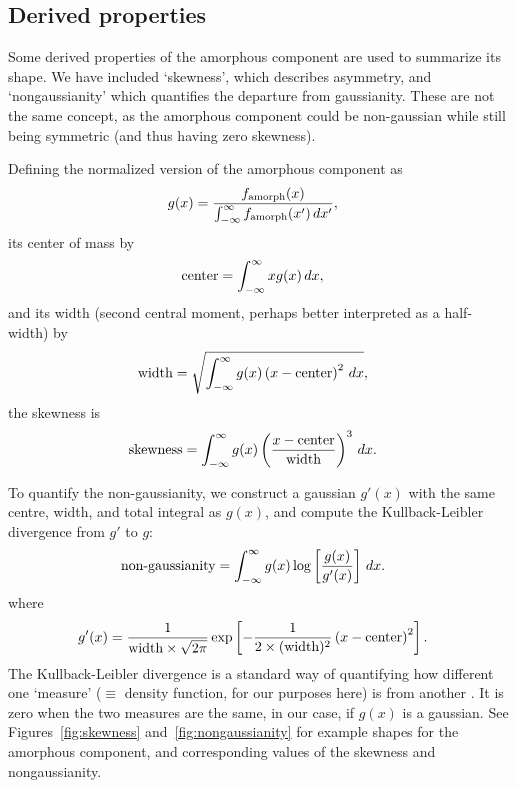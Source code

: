 \documentclass[preprint, a4paper]{elsarticle}
\newcommand{\x}{x}
\begin{document}
\subsection{Derived properties}
Some derived properties of the amorphous component are used to summarize its shape.
We have included `skewness', which describes asymmetry, and `nongaussianity'
which quantifies the departure from gaussianity. These are not the same
concept, as the amorphous component could be non-gaussian while still being symmetric
(and thus having zero skewness).

Defining the normalized version of the amorphous component as
\begin{align}
g(\x) &= \frac{f_{\rm amorph}(\x)}
             {\int_{-\infty}^\infty f_{\rm amorph}(\x') \, d\x'},
\end{align}
its center of mass by
\begin{align}
\textnormal{center} &= \int_{-\infty}^\infty x g(\x) \, d\x,
\end{align}
and its width (second central moment, perhaps better interpreted
as a half-width) by
\begin{align}
\textnormal{width} &= \sqrt{\int_{-\infty}^\infty
                            g(\x) \left(\x - \textnormal{center}\right)^2
                            \, d\x},
\end{align}
the skewness is
\begin{align}
\textnormal{skewness} &= \int_{-\infty}^\infty
                           g(\x) 
                           \left(
                             \frac{x - \textnormal{center}}{\textnormal{width}}
                           \right)^3
                         \, d\x.
\end{align}

To quantify the non-gaussianity, we construct a gaussian
$g'(\x)$
with the same centre, width, and total integral as $g(\x)$, and compute the
Kullback-Leibler divergence from $g'$ to $g$:
\begin{align}
\textnormal{non-gaussianity} &= 
    \int_{-\infty}^\infty g(\x) \log\left[\frac{g(\x)}{g'(\x)}\right] \, d\x.
\end{align}
where
\begin{align}
g'(\x) &= \frac{1}{\textnormal{width} \times \sqrt{2\pi}}
            \exp\left[-\frac{1}{2\times (\textnormal{width})^2}
                    \left(\x - \textnormal{center}\right)^2\right].
\end{align}
The Kullback-Leibler divergence is a standard way of quantifying how
different one `measure' ($\equiv$ density function, for our purposes here) is from another \citep{knuth2012foundations}.
It is zero when the two measures are the same, in our case,
if $g(\x)$ is a gaussian. See Figures~\ref{fig:skewness} and~\ref{fig:nongaussianity} for example
shapes for the amorphous component, and corresponding values of the skewness
and nongaussianity.
\end{document}
